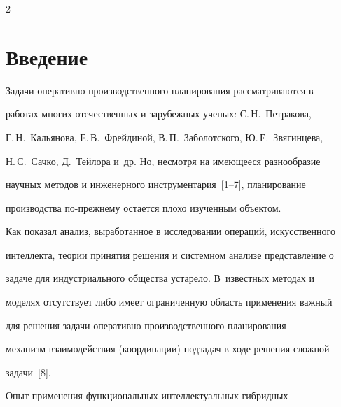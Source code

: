 




      \thispagestyle{headings}





      \begin{multicols}{2}





      \label{st\stat}





\section{Введение}





  Задачи оперативно-производственного планирования рассматриваются в 


работах многих отечественных и зарубежных ученых: С.\,Н.~Петракова, 


Г.\,Н.~Кальянова, Е.\,В.~Фрейдиной, В.\,П.~Заболотского, Ю.\,Е.~Звягинцева, 


Н.\,С.~Сачко, Д.~Тейлора и~др. Но, несмотря на имеющееся разнообразие 


научных методов и инженерного инструментария~[1--7], планирование 


производства по-прежнему остается плохо изученным объектом.


  


  Как показал анализ, выработанное в исследовании операций, искусственного 


интеллекта, теории принятия решения и системном анализе представление о 


задаче для индустриального общества устарело. В~известных методах и 


моделях отсутствует либо имеет ограниченную область применения важный 


для решения задачи опе\-ра\-тив\-но-про\-из\-вод\-ст\-вен\-но\-го планирования 


механизм взаимодействия (координации) подзадач в ходе решения сложной 


задачи~[8].


  


  Опыт применения функциональных интеллектуальных гибридных 



\end{multicols}
